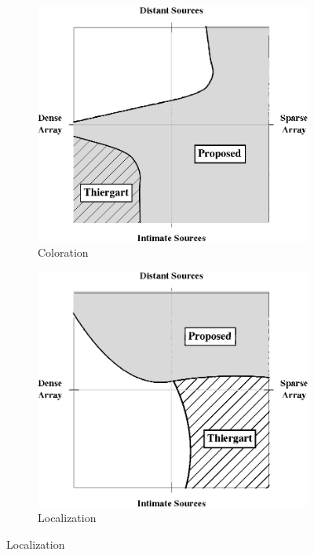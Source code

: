 \begin{figure}[t]
	\centering
	\begin{subfigure}[b]{0.49\textwidth}
		\includegraphics[width=\textwidth]{09_thiergart_comparison/figures/Coloration_Region_Plot}
		\caption{Coloration}
		\label{fig:09_Thiergart_Comparison:Region_Plots:Coloration}
	\end{subfigure}
	\hfill
	\begin{subfigure}[b]{0.49\textwidth}
		\includegraphics[width=\textwidth]{09_thiergart_comparison/figures/Localization_Region_Plot}
		\caption{Localization}
		\label{fig:09_Thiergart_Comparison:Region_Plots:Localization}
	\end{subfigure}
	

\end{figure}
